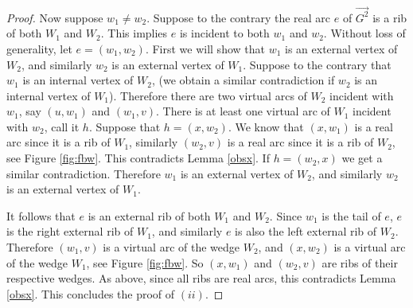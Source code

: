 \documentclass[12pt,letterpaper,oneside]{book}
\begin{document}
\begin{proof}



Now suppose $w_1 \ne w_2$.  Suppose to the contrary the real arc $e$ of $\vec{G^2}$ is a 
rib of both $W_1$ and $W_2$.  This implies $e$ is incident to both $w_1$ and $w_2$.  Without loss of generality, 
let $e=(w_1,w_2)$.  
First we will show that $w_1$ is an external vertex of $W_2$, and similarly $w_2$ is an external vertex of $W_1$.   
Suppose to the contrary 
that $w_1$ is an internal vertex of $W_2$, (we obtain a similar contradiction if 
$w_2$ is an internal vertex of $W_1$).  
Therefore there are two virtual arcs of $W_2$ incident with $w_1$, say $(u,w_1)$ and $(w_1,v)$.  
There is at least one virtual arc of $W_1$ incident with $w_2$, call it $h$.  
Suppose that $h=(x,w_2)$.  We know that $(x,w_1)$ is a real arc since  
it is a rib of $W_1$, similarly $(w_2,v)$ is a real arc since it is a rib of $W_2$, see Figure \ref{fig:fbw}.  
This contradicts Lemma \ref{obsx}.  If $h=(w_2,x)$ we get a similar  
contradiction.  Therefore $w_1$ is an external vertex of $W_2$, and similarly $w_2$ is an external vertex of $W_1$.  
 
It follows that $e$ is an external rib of both $W_1$ and $W_2$.  Since $w_1$ is the 
tail of $e$, $e$ is the right 
external rib of $W_1$, and similarly $e$ is also the left external rib of $W_2$.  %
Therefore $(w_1,v)$ is a virtual arc of the wedge $W_2$, and 
$(x,w_2)$ is a virtual arc of the wedge $W_1$, see Figure \ref{fig:fbw}.  So $(x,w_1)$ and $(w_2,v)$ are ribs 
of their respective wedges.  As above, since all ribs are real arcs, this contradicts Lemma \ref{obsx}.  
This concludes the proof of $(ii)$.   




\end{proof}
\end{document}
